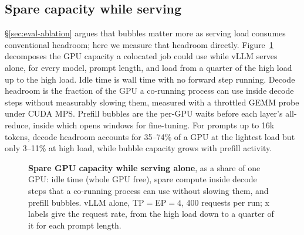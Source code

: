 \subsection{Spare capacity while serving}
\label{sec:appx-capacity}

\S\ref{sec:eval-ablation} argues that bubbles matter more as serving load
consumes conventional headroom; here we measure that headroom directly.
Figure~\ref{fig:appx-capacity} decomposes the GPU capacity a colocated
job could use while vLLM serves alone, for every model, prompt length,
and load from a quarter of the high load up to the high load. Idle time
is wall time with no forward step running. Decode headroom is the
fraction of the GPU a co-running process can use inside decode steps
without measurably slowing them, measured with a throttled GEMM probe
under CUDA MPS. Prefill bubbles are the per-GPU waits before each layer's
all-reduce, inside which \sys{} opens windows for fine-tuning. For prompts up to 16k tokens, decode
headroom accounts for 35--74\% of a GPU at the lightest load but only
3--11\% at high load, while bubble capacity grows with prefill activity.

\begin{figure}[t]
  \centering
  \caption{\textbf{Spare GPU capacity while serving alone}, as a share of
    one GPU: idle time (whole GPU free), spare compute inside decode
    steps that a co-running process can use without slowing them, and
    prefill bubbles. vLLM alone, \ac{TP}$=$\ac{EP}$=4$, 400 requests per
    run; x labels give the request rate, from the high load down to a
    quarter of it for each prompt length.}
  \label{fig:appx-capacity}
\end{figure}

